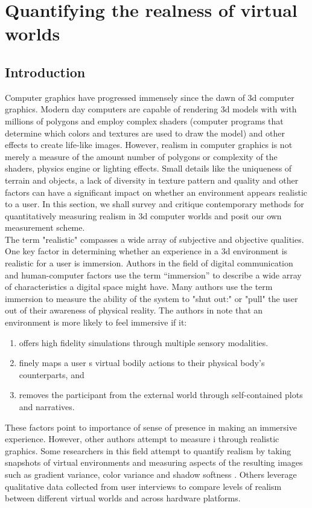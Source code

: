  
\chapter{Quantifying the realness of virtual worlds }\label{text}
\section{Introduction}


Computer graphics have progressed immensely since the dawn of 3d computer graphics. Modern day computers are capable of rendering 3d models with with millions of polygons and employ complex shaders (computer programs that determine which colors and textures are used to draw the model) and other effects to create life-like images. However, realism in computer graphics is not merely a measure of the amount number of polygons or complexity of the shaders, physics engine or lighting effects. Small details like the uniqueness of terrain and objects, a lack of diversity in texture pattern and quality and other factors can have a significant impact on whether an environment appears realistic to a user. In this section, we shall survey and critique contemporary methods for quantitatively measuring realism in 3d computer worlds and posit our own measurement scheme. 
\\

The term "realistic" compasses a wide array of subjective and objective qualities. One key factor in determining whether an experience in a 3d environment is realistic for a user is immersion. Authors in the field of digital communication and human-computer factors use the term “immersion” to describe a wide array of characteristics a digital space might have. Many authors use the term immersion to measure the ability of the system to "shut out:" or "pull" the user out of their awareness of physical reality. The authors in \citep{Cummings_2015}
 note that an environment is more likely to feel immersive if it:
 \begin{enumerate}


\item offers high fidelity simulations
through multiple sensory modalities. \item finely maps a user
s virtual bodily
actions to their physical body's counterparts, and \item removes the participant
from the external world through self-contained plots and narratives. 
 \end{enumerate}
These factors point to importance of sense of presence in making an immersive experience. However, other authors attempt to measure i through realistic graphics. Some researchers in this field attempt to quantify realism by taking snapshots of virtual environments and measuring aspects of the resulting images such as gradient variance, color variance and shadow
softness \cite{Wang:2011:RRP:2013879.2014089}. Others leverage qualitative data collected from user interviews to compare levels of realism between different virtual worlds and across hardware platforms.
\\

